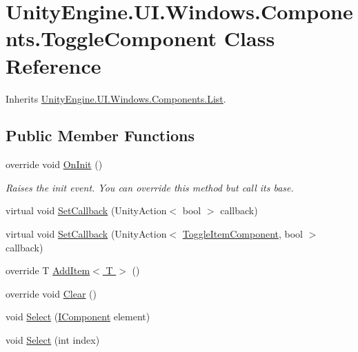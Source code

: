 \hypertarget{class_unity_engine_1_1_u_i_1_1_windows_1_1_components_1_1_toggle_component}{}\section{Unity\+Engine.\+U\+I.\+Windows.\+Components.\+Toggle\+Component Class Reference}
\label{class_unity_engine_1_1_u_i_1_1_windows_1_1_components_1_1_toggle_component}


Inherits \hyperlink{class_unity_engine_1_1_u_i_1_1_windows_1_1_components_1_1_list}{Unity\+Engine.\+U\+I.\+Windows.\+Components.\+List}.

\subsection*{Public Member Functions}
\begin{DoxyCompactItemize}
\item 
override void \hyperlink{class_unity_engine_1_1_u_i_1_1_windows_1_1_components_1_1_toggle_component_a5974ccee306a24708d91ed697f9e7015}{On\+Init} ()
\begin{DoxyCompactList}\small\item\em Raises the init event. You can override this method but call it\textquotesingle{}s base. \end{DoxyCompactList}\item 
virtual void \hyperlink{class_unity_engine_1_1_u_i_1_1_windows_1_1_components_1_1_toggle_component_aae12ebeac547d6b01a7982e1a0e1bdc5}{Set\+Callback} (Unity\+Action$<$ bool $>$ callback)
\item 
virtual void \hyperlink{class_unity_engine_1_1_u_i_1_1_windows_1_1_components_1_1_toggle_component_a033bcbb0ec7f14228ab37c98e1582cfa}{Set\+Callback} (Unity\+Action$<$ \hyperlink{class_unity_engine_1_1_u_i_1_1_windows_1_1_components_1_1_toggle_item_component}{Toggle\+Item\+Component}, bool $>$ callback)
\item 
override T \hyperlink{class_unity_engine_1_1_u_i_1_1_windows_1_1_components_1_1_toggle_component_aedda58ae99096e767eeb2d32a7cb435d}{Add\+Item$<$ T $>$} ()
\item 
override void \hyperlink{class_unity_engine_1_1_u_i_1_1_windows_1_1_components_1_1_toggle_component_aba8d5c73c9cfd22bf2e86a53a10430f5}{Clear} ()
\item 
void \hyperlink{class_unity_engine_1_1_u_i_1_1_windows_1_1_components_1_1_toggle_component_ac3f5dc4494348675fb31ea5ae0a10b23}{Select} (\hyperlink{interface_unity_engine_1_1_u_i_1_1_windows_1_1_components_1_1_i_component}{I\+Component} element)
\item 
void \hyperlink{class_unity_engine_1_1_u_i_1_1_windows_1_1_components_1_1_toggle_component_ad1f6ebf20d5e16e27d9ddcc819470f1b}{Select} (int index)
\end{DoxyCompactItemize}
